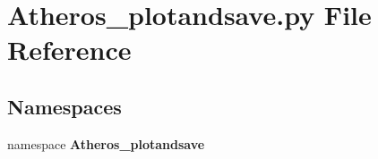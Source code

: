 \section{Atheros\_\-plotandsave.py File Reference}
\label{Atheros__plotandsave_8py}
\subsection*{Namespaces}
\begin{CompactItemize}
\item 
namespace {\bf Atheros\_\-plotandsave}
\end{CompactItemize}
